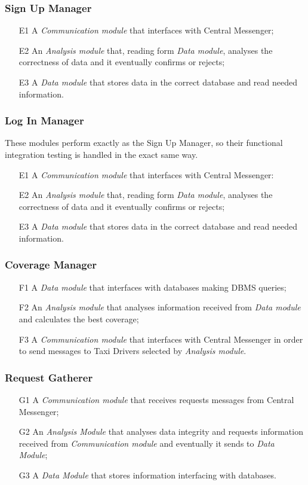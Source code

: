 \subsubsection{Sign Up Manager}
\begin{itemize}
\item [E1] A \emph{Communication module} that interfaces with Central Messenger;
\item [E2] An \emph{Analysis module} that, reading form \emph{Data module}, analyses the correctness of data and it eventually confirms or rejects;
\item [E3] A \emph{Data module} that stores data in the correct database and read needed information.
\end{itemize}

\subsubsection{Log In Manager}
These modules perform exactly as the Sign Up Manager, so their functional integration testing is handled in the exact same way.
\begin{itemize}
\item [E1] A \emph{Communication module} that interfaces with Central Messenger:
\item [E2] An \emph{Analysis module} that, reading form \emph{Data module}, analyses the correctness of data and it eventually confirms or rejects;
\item [E3] A \emph{Data module} that stores data in the correct database and read needed information.
\end{itemize}

\subsubsection{Coverage Manager}
\begin{itemize}
\item [F1] A \emph{Data module} that interfaces with databases making DBMS queries;
\item [F2] An \emph{Analysis module} that analyses information received from \emph{Data module} and calculates the best coverage;
\item [F3] A \emph{Communication module} that interfaces with Central Messenger in order to send messages to Taxi Drivers selected by \emph{Analysis module}.
\end{itemize}

\subsubsection{Request Gatherer}
\begin{itemize}
\item [G1] A \emph{Communication module} that receives requests messages from Central Messenger;
\item [G2] An \emph{Analysis Module} that analyses data integrity and requests information received from \emph{Communication module} and eventually it sends to \emph{Data Module};
\item [G3] A \emph{Data Module} that stores information interfacing with databases.
\end{itemize}

